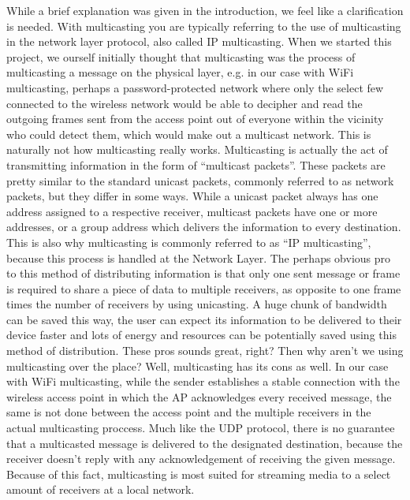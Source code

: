 \documentclass[9pt,a4paper]{acmproc}
\begin{document}
While a brief explanation was given in the introduction, we feel like a clarification is needed. With multicasting you are typically referring to the use of multicasting in the network layer protocol, also called IP multicasting. When we started this project, we ourself initially thought that multicasting was the process of multicasting a message on the physical layer, e.g. in our case with WiFi multicasting, perhaps a password-protected network where only the select few connected to the wireless network would be able to decipher and read the outgoing frames sent from the access point out of everyone within the vicinity who could detect them, which would make out a multicast network. This is naturally not how multicasting really works.
	Multicasting is actually the act of transmitting information in the form of “multicast packets”. These packets are pretty similar to the standard unicast packets, commonly referred to as network packets, but they differ in some ways. While a unicast packet always has one address assigned to a respective receiver, multicast packets have one or more addresses, or a group address which delivers the information to every destination. This is also why multicasting is commonly referred to as “IP multicasting”, because this process is handled at the Network Layer. The perhaps obvious pro to this method of distributing information is that only one sent message or frame is required to share a piece of data to multiple receivers, as opposite to one frame times the number of receivers by using unicasting. A huge chunk of bandwidth can be saved this way, the user can expect its information to be delivered to their device faster and lots of energy and resources can be potentially saved using this method of distribution.
	These pros sounds great, right? Then why aren’t we using multicasting over the place? Well, multicasting has its cons as well. In our case with WiFi multicasting, while the sender establishes a stable connection with the wireless access point in which the AP acknowledges every received message, the same is not done between the access point and the multiple receivers in the actual multicasting proccess. Much like the UDP protocol, there is no guarantee that a multicasted message is delivered to the designated destination, because the receiver doesn’t reply with any acknowledgement of receiving the given message. Because of this fact, multicasting is most suited for streaming media to a select amount of receivers at a local network. 
\end{document}
